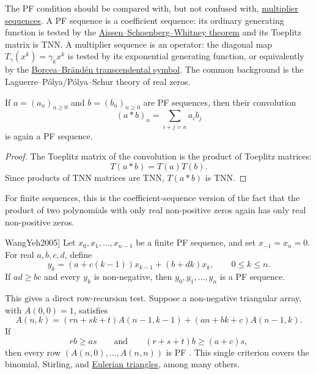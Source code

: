 \begin{remark*}
The PF condition should be compared with, but not confused with,
\hyperref[multiplierSequences]{multiplier sequences}.  A PF sequence is a
coefficient sequence: its ordinary generating function is tested by the
\hyperref[aissenSchoenbergWhitney]{Aissen--Schoenberg--Whitney theorem} and
its Toeplitz matrix is TNN.  A multiplier sequence is an operator:
the diagonal map \(T_\gamma(x^k)=\gamma_kx^k\) is tested by its exponential
generating function, or equivalently by the
\hyperref[borceaBrandenTranscendentalSymbol]{Borcea--Brändén
transcendental symbol}.  The common background is the
Laguerre--Pólya/Pólya--Schur theory of real zeros.
\end{remark*}

\begin{proposition}
\label{pfConvolution}
If \(a=(a_n)_{n\geq 0}\) and \(b=(b_n)_{n\geq 0}\) are PF sequences, then
their convolution
\[
  (a*b)_n=\sum_{i+j=n} a_i b_j
\]
is again a PF sequence.
\end{proposition}

\begin{proof}
The Toeplitz matrix of the convolution is the product of Toeplitz matrices:
\[
  T(a*b)=T(a)T(b).
\]
Since products of TNN matrices are TNN, \(T(a*b)\) is TNN.
\end{proof}

For finite sequences, this is the coefficient-sequence version of the fact
that the product of two polynomials with only real non-positive zeros again
has only real non-positive zeros.

\begin{theorem}[Wang--Yeh PF preserver, \cite[Cor.~2]{WangYeh2005}]
\label{wangYehPfPreserver}
Let \(x_0,x_1,\dotsc,x_{n-1}\) be a finite PF sequence, and set
\(x_{-1}=x_n=0\).  For real \(a,b,c,d\), define
\[
  y_k=(a+c(k-1))x_{k-1}+(b+dk)x_k,
  \qquad 0\leq k\leq n.
\]
If \(ad\geq bc\) and every \(y_k\) is non-negative, then
\(y_0,y_1,\dotsc,y_n\) is a PF sequence.
\end{theorem}

This gives a direct row-recursion test.  Suppose a non-negative triangular
array, with \(A(0,0)=1\), satisfies
\[
 A(n,k)=(rn+sk+t)A(n-1,k-1)+(an+bk+c)A(n-1,k).
\]
If
\[
 rb\geq as
 \qquad\text{and}\qquad
 (r+s+t)b\geq(a+c)s,
\]
then every row \((A(n,0),\dotsc,A(n,n))\) is PF
\cite[Cor.~3]{WangYeh2005}.  This single criterion covers the binomial,
Stirling, and \hyperref[eulerianZeros]{Eulerian triangles}, among many others.

